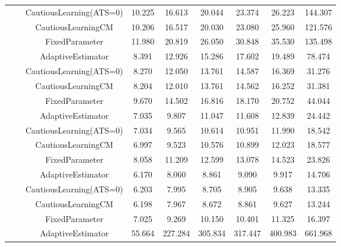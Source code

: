 \begin{table}[!h]
\begin{tabular}[t]{ccccccccc}
 &  & CautiousLearning(ATS=0) & 10.225 & 16.613 & 20.044 & 23.374 & 26.223 & 144.307\\

 &  & CautiousLearningCM & 10.206 & 16.517 & 20.030 & 23.080 & 25.960 & 121.576\\

 & \multirow[t]{-4}{*}{\centering\arraybackslash 0.75} & FixedParameter & 11.980 & 20.819 & 26.050 & 30.848 & 35.530 & 135.498\\
\cmidrule{2-9}
 &  & AdaptiveEstimator & 8.391 & 12.926 & 15.286 & 17.602 & 19.489 & 78.474\\

 &  & CautiousLearning(ATS=0) & 8.270 & 12.050 & 13.761 & 14.587 & 16.369 & 31.276\\

 &  & CautiousLearningCM & 8.204 & 12.010 & 13.761 & 14.562 & 16.252 & 31.381\\

 & \multirow[t]{-4}{*}{\centering\arraybackslash 1.00} & FixedParameter & 9.670 & 14.502 & 16.816 & 18.170 & 20.752 & 44.044\\
\cmidrule{2-9}
 &  & AdaptiveEstimator & 7.035 & 9.807 & 11.047 & 11.608 & 12.839 & 24.442\\

 &  & CautiousLearning(ATS=0) & 7.034 & 9.565 & 10.614 & 10.951 & 11.990 & 18.542\\

 &  & CautiousLearningCM & 6.997 & 9.523 & 10.576 & 10.899 & 12.023 & 18.577\\

 & \multirow[t]{-4}{*}{\centering\arraybackslash 1.25} & FixedParameter & 8.058 & 11.209 & 12.599 & 13.078 & 14.523 & 23.826\\
\cmidrule{2-9}
 &  & AdaptiveEstimator & 6.170 & 8.060 & 8.861 & 9.090 & 9.917 & 14.706\\

 &  & CautiousLearning(ATS=0) & 6.203 & 7.995 & 8.705 & 8.905 & 9.638 & 13.335\\

 &  & CautiousLearningCM & 6.198 & 7.967 & 8.672 & 8.861 & 9.627 & 13.244\\

\multirow[t]{-28}{*}{\centering\arraybackslash 1} & \multirow[t]{-4}{*}{\centering\arraybackslash 1.50} & FixedParameter & 7.025 & 9.269 & 10.150 & 10.401 & 11.325 & 16.397\\
\cmidrule{1-9}
 &  & AdaptiveEstimator & 55.664 & 227.284 & 305.834 & 317.447 & 400.983 & 661.968\\


\end{tabular}
\end{table}
